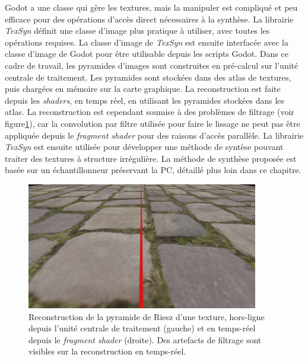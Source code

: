\bigskip

Godot a une classe qui gère les textures, mais la manipuler est compliqué et peu efficace pour des opérations d'accès direct nécessaires à la synthèse. La librairie \textit{TexSyn} définit une classe d'image plus pratique à utiliser, avec toutes les opérations requises. La classe d'image de \textit{TexSyn} est ensuite interfacée avec la classe d'image de Godot pour être utilisable depuis les scripts Godot. Dans ce cadre de travail, les pyramides d'images sont construites en pré-calcul sur l'unité centrale de traitement. Les pyramides sont stockées dans des atlas de textures, puis chargées en mémoire sur la carte graphique. La reconstruction est faite depuis les \textit{shaders}, en temps réel, en utilisant les pyramides stockées dans les atlas. La reconstruction est cependant soumise à des problèmes de filtrage (voir figure\ref{fig:texsyn-reconstruction}), car la convolution par filtre utilisée pour faire le lissage ne peut pas être appliquée depuis le \textit{fragment shader} pour des raisons d'accès parallèle. La librairie \textit{TexSyn} est ensuite utilisée pour développer une méthode de syntèse pouvant traiter des textures à structure irrégulière. La méthode de synthèse proposée est basée sur un échantillonneur préservant la PC, détaillé plus loin dans ce chapitre.

\begin{figure}
    \centering
    \includegraphics[width=0.9\textwidth]{contenu/resources/images/reconstruction_cpu_vs_gpu}
    \caption[Reconstruction de texture dans \textit{TexSyn}]{Reconstruction de la pyramide de Riesz d'une texture, hors-ligne depuis l'unité centrale de traitement (gauche) et en temps-réel depuis le \textit{fragment shader} (droite). Des artefacts de filtrage sont visibles sur la reconstruction en temps-réel.}
    \label{fig:texsyn-reconstruction}
\end{figure}


